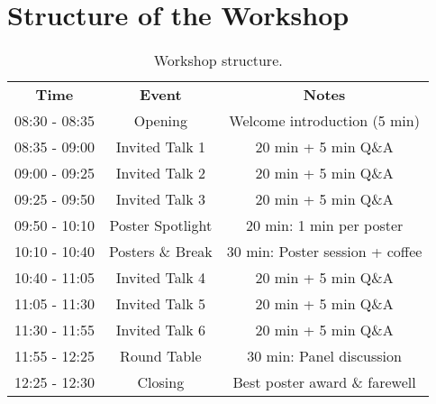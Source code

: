 \documentclass[12pt,a4paper]{article}
\begin{document}
%
\section{Structure of the Workshop} \label{sec_structure_of_the_workshop}
%
\begin{table}[h!]
	\centering
	\begin{tabular}{c|c|c}
		\toprule 
    \textbf{Time} & \textbf{Event} & \textbf{Notes} \\ 
    \cline{1-3}
    08:30 - 08:35 & Opening & Welcome introduction (5 min) \\
		08:35 - 09:00 & Invited Talk 1 & 20 min + 5 min Q\&A \\
		09:00 - 09:25 & Invited Talk 2 & 20 min + 5 min Q\&A \\
		09:25 - 09:50 & Invited Talk 3 & 20 min + 5 min Q\&A \\
		09:50 - 10:10 & Poster Spotlight & 20 min: 1 min per poster \\
		10:10 - 10:40 & Posters \& Break & 30 min: Poster session + coffee \\ 
		10:40 - 11:05 & Invited Talk 4 & 20 min + 5 min Q\&A \\
		11:05 - 11:30 & Invited Talk 5 & 20
		min + 5 min Q\&A \\
		11:30 - 11:55 & Invited Talk 6 & 20 min + 5 min Q\&A \\
		11:55 - 12:25 & Round Table & 30 min: Panel discussion \\
		12:25 - 12:30 & Closing & Best poster award \& farewell\\
		\toprule
	\end{tabular}
	\caption{Workshop structure.}
	\label{tab_workshop_structure}
\end{table}
%
\end{document}

